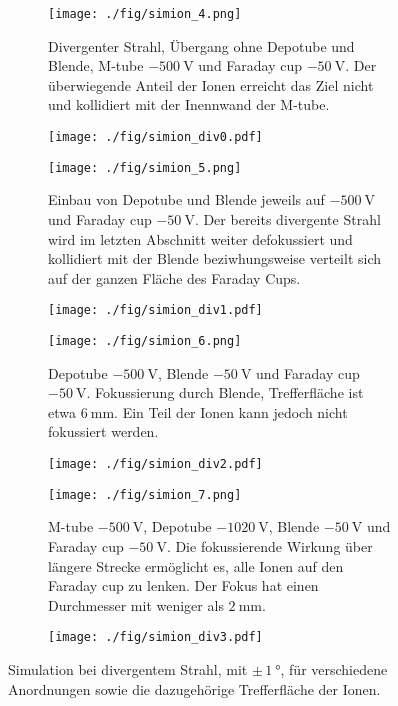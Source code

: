 \begin{figure}
  \begin{subfigure}[h]{0.50\textwidth}
    \texttt{[image: ./fig/simion\_4.png]}
    \caption{Divergenter Strahl, Übergang ohne Depotube und Blende, M-tube $\SI{-500}{\volt}$ und Faraday cup $\SI{-50}{\volt}$. Der überwiegende Anteil der Ionen erreicht das Ziel nicht und kollidiert mit der Inennwand der M-tube.}
    \label{fig:div0}
  \end{subfigure}\hfill
  \begin{subfigure}[h]{0.4\textwidth}
    \texttt{[image: ./fig/simion\_div0.pdf]}
    \label{fig:div1}
  \end{subfigure}\hfill
  \begin{subfigure}[h]{0.50\textwidth}
    \texttt{[image: ./fig/simion\_5.png]}
    \caption{Einbau von Depotube und Blende jeweils auf $\SI{-500}{\volt}$ und Faraday cup $\SI{-50}{\volt}$. Der bereits divergente Strahl wird im letzten Abschnitt weiter defokussiert und kollidiert mit der Blende beziwhungsweise verteilt sich auf der ganzen Fläche des Faraday Cups.}
    \label{fig:div2}
  \end{subfigure}\hfill
  \begin{subfigure}[h]{0.4\textwidth}
    \texttt{[image: ./fig/simion\_div1.pdf]}
    \label{fig:div3}
  \end{subfigure}\hfill
  \begin{subfigure}[h]{0.50\textwidth}
    \texttt{[image: ./fig/simion\_6.png]}
    \caption{Depotube $\SI{-500}{\volt}$, Blende $\SI{-50}{\volt}$ und Faraday cup $\SI{-50}{\volt}$. Fokussierung durch Blende, Trefferfläche ist etwa $\SI{6}{\mm}$. Ein Teil der Ionen kann jedoch nicht fokussiert werden.}
    \label{fig:div4}
  \end{subfigure}\hfill
  \begin{subfigure}[h]{0.4\textwidth}
    \texttt{[image: ./fig/simion\_div2.pdf]}
    \label{fig:div5}
  \end{subfigure}\hfill
  \begin{subfigure}[h]{0.50\textwidth}
    \texttt{[image: ./fig/simion\_7.png]}
    \caption{M-tube $\SI{-500}{\volt}$, Depotube $\SI{-1020}{\volt}$, Blende $\SI{-50}{\volt}$ und Faraday cup $\SI{-50}{\volt}$. Die fokussierende Wirkung über längere Strecke ermöglicht es, alle Ionen auf den Faraday cup zu lenken. Der Fokus hat einen Durchmesser mit weniger als $\SI{2}{\mm}$.}
    \label{fig:div6}
  \end{subfigure}\hfill
  \begin{subfigure}[h]{0.4\textwidth}
    \texttt{[image: ./fig/simion\_div3.pdf]}
    \label{fig:div7}
  \end{subfigure}
  \caption{Simulation bei divergentem Strahl, mit $\pm\,\SI{1}{\degree}$, für verschiedene Anordnungen sowie die dazugehörige Trefferfläche der Ionen.}
  \label{fig:simion_div}
\end{figure}


